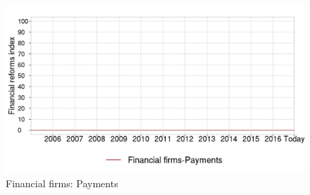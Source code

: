 \documentclass[a4paper,12pt,leqno]{article}
\begin{document}
\begin{figure}[H]
  \caption{Financial firms: Payments}
  \centering
  \includegraphics[width=0.65\paperwidth,height=0.45\paperwidth]{../GRAPHS/frm_index_financial_firms_payments.png}
\end{figure}
\end{document}
